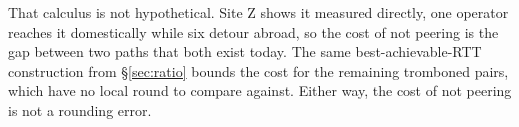 \documentclass[sigconf,anonymous,10pt]{acmart}
\begin{document}

That calculus is not hypothetical. Site Z shows it measured directly, one operator reaches it domestically while six detour abroad, so the cost of not peering is the gap between two paths that both exist today. The same best-achievable-RTT construction from \S\ref{sec:ratio} bounds the cost for the remaining tromboned pairs, which have no local round to compare against. Either way, the cost of not peering is not a rounding error.


\end{document}
